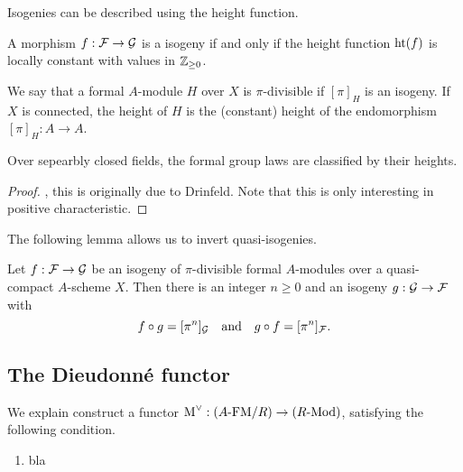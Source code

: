 \documentclass[../main.tex]{subfiles}
\begin{document}
Isogenies can be described using the height function.

\begin{lem}
  A morphism $f: \mathcal{F} \to \mathcal{G}$ is a isogeny if and only if the height 
  function $\textnormal{ht}(f)$ is locally constant with values in $\mathbb{Z}_{\geq 0}$. 
\end{lem}

\begin{defi}
  We say that a formal $A$-module $H$ over $X$ is $\pi$-divisible if 
  $[\pi]_H$ is an isogeny. If $X$ is connected, the height of $H$ is the
  (constant) height of the endomorphism $[\pi]_H: A \to A$. 
\end{defi}

\begin{lem}
  Over sepearbly closed fields, the formal group laws are classified by their 
  heights.
\begin{proof}
  \cite[Theorem 19.4.1]{hazewinkel1978formal}, this is originally due to Drinfeld.
  Note that this is only interesting in positive characteristic.
\end{proof}
\end{lem}

The following lemma allows us to invert quasi-isogenies.

\begin{lem}
  Let $f: \mathcal{F} \to \mathcal{G}$ be an isogeny of $\pi$-divisible formal $A$-modules over a
  quasi-compact  $A$-scheme $X$. Then there is an 
  integer $n \geq 0$ and an isogeny $g: \mathcal{G} \to \mathcal{F}$ with 
  \begin{equation*}
    f \circ g = [\pi^n]_{\mathcal{G}} \quad \text{and} \quad g \circ f = [\pi^n]_{\mathcal{F}}.
  \end{equation*}
\end{lem}

\subsection{The Dieudonn\'e functor} %
\label{sub:The Dieudonne functor}
We explain construct a functor ${\operatorname M}^\vee: {({A}\text-\mathrm{FM}/{R})} \to {({R}\text-\mathrm{Mod})}$, satisfying the 
following condition.
\begin{enumerate}
  \item bla
\end{enumerate}
\end{document}
